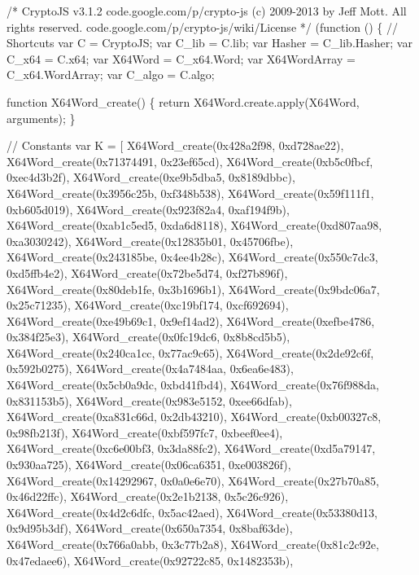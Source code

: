 \begin{DoxyCodeInclude}
\textcolor{comment}{/*}
\textcolor{comment}{CryptoJS v3.1.2}
\textcolor{comment}{code.google.com/p/crypto-js}
\textcolor{comment}{(c) 2009-2013 by Jeff Mott. All rights reserved.}
\textcolor{comment}{code.google.com/p/crypto-js/wiki/License}
\textcolor{comment}{*/}
(\textcolor{keyword}{function} () \{
    \textcolor{comment}{// Shortcuts}
    var C = CryptoJS;
    var C\_lib = C.lib;
    var Hasher = C\_lib.Hasher;
    var C\_x64 = C.x64;
    var X64Word = C\_x64.Word;
    var X64WordArray = C\_x64.WordArray;
    var C\_algo = C.algo;

    \textcolor{keyword}{function} X64Word\_create() \{
        \textcolor{keywordflow}{return} X64Word.create.apply(X64Word, arguments);
    \}

    \textcolor{comment}{// Constants}
    var K = [
        X64Word\_create(0x428a2f98, 0xd728ae22), X64Word\_create(0x71374491, 0x23ef65cd),
        X64Word\_create(0xb5c0fbcf, 0xec4d3b2f), X64Word\_create(0xe9b5dba5, 0x8189dbbc),
        X64Word\_create(0x3956c25b, 0xf348b538), X64Word\_create(0x59f111f1, 0xb605d019),
        X64Word\_create(0x923f82a4, 0xaf194f9b), X64Word\_create(0xab1c5ed5, 0xda6d8118),
        X64Word\_create(0xd807aa98, 0xa3030242), X64Word\_create(0x12835b01, 0x45706fbe),
        X64Word\_create(0x243185be, 0x4ee4b28c), X64Word\_create(0x550c7dc3, 0xd5ffb4e2),
        X64Word\_create(0x72be5d74, 0xf27b896f), X64Word\_create(0x80deb1fe, 0x3b1696b1),
        X64Word\_create(0x9bdc06a7, 0x25c71235), X64Word\_create(0xc19bf174, 0xcf692694),
        X64Word\_create(0xe49b69c1, 0x9ef14ad2), X64Word\_create(0xefbe4786, 0x384f25e3),
        X64Word\_create(0x0fc19dc6, 0x8b8cd5b5), X64Word\_create(0x240ca1cc, 0x77ac9c65),
        X64Word\_create(0x2de92c6f, 0x592b0275), X64Word\_create(0x4a7484aa, 0x6ea6e483),
        X64Word\_create(0x5cb0a9dc, 0xbd41fbd4), X64Word\_create(0x76f988da, 0x831153b5),
        X64Word\_create(0x983e5152, 0xee66dfab), X64Word\_create(0xa831c66d, 0x2db43210),
        X64Word\_create(0xb00327c8, 0x98fb213f), X64Word\_create(0xbf597fc7, 0xbeef0ee4),
        X64Word\_create(0xc6e00bf3, 0x3da88fc2), X64Word\_create(0xd5a79147, 0x930aa725),
        X64Word\_create(0x06ca6351, 0xe003826f), X64Word\_create(0x14292967, 0x0a0e6e70),
        X64Word\_create(0x27b70a85, 0x46d22ffc), X64Word\_create(0x2e1b2138, 0x5c26c926),
        X64Word\_create(0x4d2c6dfc, 0x5ac42aed), X64Word\_create(0x53380d13, 0x9d95b3df),
        X64Word\_create(0x650a7354, 0x8baf63de), X64Word\_create(0x766a0abb, 0x3c77b2a8),
        X64Word\_create(0x81c2c92e, 0x47edaee6), X64Word\_create(0x92722c85, 0x1482353b),

\end{DoxyCodeInclude}
